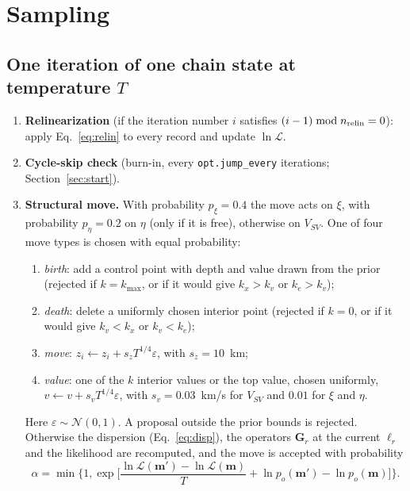 \documentclass[11pt]{article}
\newcommand{\vsv}{V_{SV}}
\begin{document}
\section{Sampling}\label{sec:mcmc}

\subsection{One iteration of one chain state at temperature $T$}
\begin{enumerate}
\item \textbf{Relinearization} (if the iteration number $i$ satisfies
  $(i-1)\bmod n_{\rm relin}=0$): apply Eq.~\eqref{eq:relin} to every record
  and update $\ln\mathcal{L}$.
\item \textbf{Cycle-skip check} (burn-in, every \texttt{opt.jump\_every}
  iterations; Section~\ref{sec:start}).
\item \textbf{Structural move.} With probability $p_\xi=0.4$ the move acts
  on $\xi$, with probability $p_\eta=0.2$ on $\eta$ (only if it is free),
  otherwise on $\vsv$. One of four move types is chosen with
  equal probability:
  \begin{enumerate}
  \item \emph{birth}: add a control point with depth and value drawn from
    the prior (rejected if $k=k_{\max}$, or if it would give $k_x>k_v$ or $k_e>k_v$);
  \item \emph{death}: delete a uniformly chosen interior point (rejected if
    $k=0$, or if it would give $k_v<k_x$ or $k_v<k_e$);
  \item \emph{move}: $z_i\leftarrow z_i+s_z T^{1/4}\varepsilon$, with
    $s_z=10$~km;
  \item \emph{value}: one of the $k$ interior values or the top value,
    chosen uniformly, $v\leftarrow v+s_vT^{1/4}\varepsilon$, with
    $s_v=0.03$~km/s for $\vsv$ and $0.01$ for $\xi$ and $\eta$.
  \end{enumerate}
  Here $\varepsilon\sim\mathcal{N}(0,1)$. A proposal outside the prior
  bounds is rejected. Otherwise the dispersion (Eq.~\ref{eq:disp}), the
  operators $\mathbf{G}_r$ at the current $\bm\ell_r$ and the likelihood
  are recomputed, and the move is accepted with probability
  \begin{equation}
   \alpha=\min\!\Big\{1,\exp\Big[\frac{\ln\mathcal{L}(\mathbf{m}')-\ln\mathcal{L}(\mathbf{m})}{T}+\ln p_o(\mathbf{m}')-\ln p_o(\mathbf{m})\Big]\Big\}.

\end{equation}
\end{enumerate}
\end{document}
